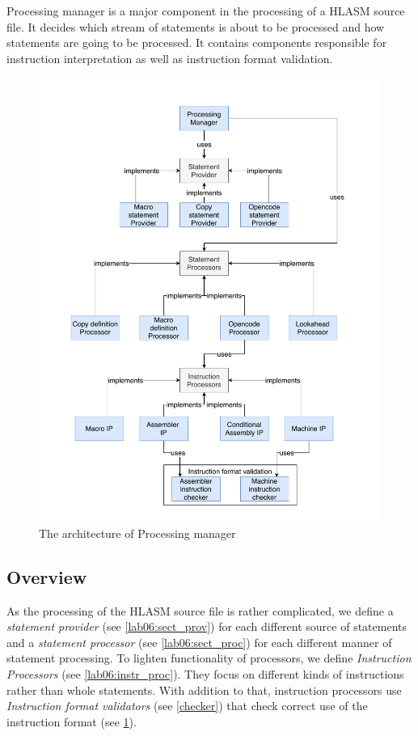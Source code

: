 \label{chap:process}
Processing manager is a major component in the processing of a HLASM source file. It decides which stream of statements is about to be processed and how statements are going to be processed. It contains components responsible for instruction interpretation as well as instruction format validation. 

\begin{figure}
	\centering
	\includegraphics[width=\textwidth]{img/processing_manager_arch}
	\caption{The architecture of Processing manager}
	\label{fig06:proc_mngr}
\end{figure}

\subsection{Overview}

As the processing of the HLASM source file is rather complicated, we define a \emph{statement provider} (see \cref{lab06:sect_prov}) for each different source of statements and a \emph{statement processor} (see \cref{lab06:sect_proc}) for each different manner of statement processing. To lighten functionality of processors, we define \emph{Instruction Processors} (see \cref{lab06:instr_proc}). They focus on different kinds of instructions rather than whole statements. With addition to that, instruction processors use \emph{Instruction format validators}  (see \cref{checker}) that check correct use of the instruction format (see \cref{fig06:proc_mngr}).

